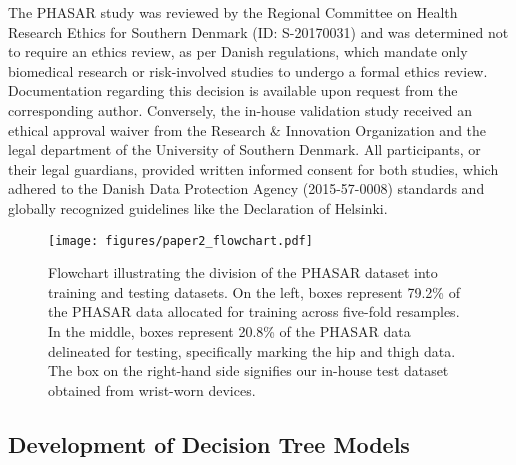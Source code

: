 \documentclass[
  10pt,
]{scrbook}
\begin{document}
The PHASAR study was reviewed by the Regional Committee on Health
Research Ethics for Southern Denmark (ID: S-20170031) and was determined
not to require an ethics review, as per Danish regulations, which
mandate only biomedical research or risk-involved studies to undergo a
formal ethics review. Documentation regarding this decision is available
upon request from the corresponding author. Conversely, the in-house
validation study received an ethical approval waiver from the Research
\& Innovation Organization and the legal department of the University of
Southern Denmark. All participants, or their legal guardians, provided
written informed consent for both studies, which adhered to the Danish
Data Protection Agency (2015-57-0008) standards and globally recognized
guidelines like the Declaration of Helsinki.

\begin{figure}

{\centering \texttt{[image: figures/paper2\_flowchart.pdf]}

}

\caption{\label{fig-paper2_flowchart}Flowchart illustrating the division
of the PHASAR dataset into training and testing datasets. On the left,
boxes represent 79.2\% of the PHASAR data allocated for training across
five-fold resamples. In the middle, boxes represent 20.8\% of the PHASAR
data delineated for testing, specifically marking the hip and thigh
data. The box on the right-hand side signifies our in-house test dataset
obtained from wrist-worn devices.}

\end{figure}

\hypertarget{development-of-decision-tree-models}{%
\subsection{Development of Decision Tree
Models}\label{development-of-decision-tree-models}}
\end{document}
